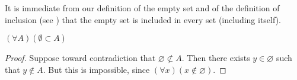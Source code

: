 
It is immediate from our definition of the empty set and of the definition of inclusion (see ) that the empty set is included in every set (including itself).

\begin{proposition}
	$(\forall A)(\emptyset \subset A)$
\end{proposition}
\begin{proof}
	Suppose toward contradiction that $\varnothing \not\subset A$.
	Then there exists $y \in \varnothing$ such that $y \not \in A$.
	But this is impossible, since $(\forall x)(x \not \in \varnothing)$.
\end{proof}
